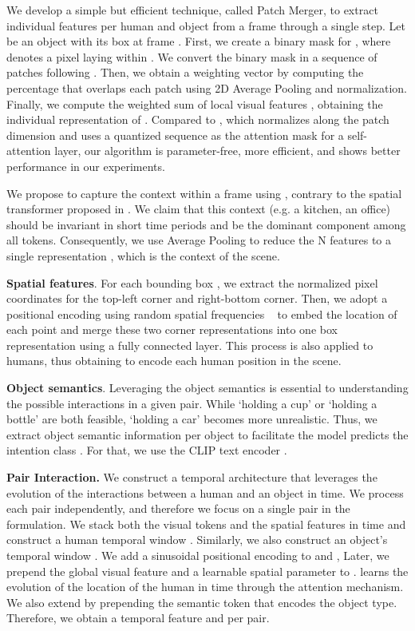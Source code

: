 \documentclass{article}
\begin{document}
We develop a simple but efficient technique, called Patch Merger, to extract individual features per human and object from a frame through a single step. Let  be an object  with its box  at frame . First, we create a binary mask for , where  denotes a pixel laying within . We convert the binary mask in a sequence of patches following \cite{dosovitskiy2020vit}. Then, we obtain a weighting vector  by computing the percentage that  overlaps each patch using 2D Average Pooling and normalization. Finally, we compute the weighted sum of local visual features , obtaining the individual representation of . Compared to \citep{park2023viplo}, which normalizes along the patch dimension and uses a quantized sequence as the attention mask for a self-attention layer, our algorithm is parameter-free, more efficient, and shows better performance in our experiments.

We propose to capture the context within a frame using , contrary to the spatial transformer proposed in \citep{NI2023103741}. We claim that this context (e.g. a kitchen, an office) should be invariant in short time periods and be the dominant component among all  tokens. Consequently,  we use Average Pooling to reduce the N  features to a single representation , which is the context of the scene. 

\textbf{Spatial features}. For each bounding box , we extract the  normalized pixel coordinates for the top-left corner and right-bottom corner. Then, we adopt a positional encoding using random spatial frequencies ~\citep{posembed_fourier} to embed the location of each point and merge these two corner representations into one box representation  using a fully connected layer.  This process is also applied to humans, thus obtaining  to encode each human  position in the scene.

\textbf{Object semantics}. Leveraging the object semantics is essential to understanding the possible interactions in a given pair. While `holding a cup' or `holding a bottle' are both feasible, `holding a car' becomes more unrealistic. Thus, we extract object semantic information   per object  to facilitate the model predicts the intention class . For that, we use the CLIP text encoder \citep{clip}.


\textbf{Pair Interaction. }
We construct a temporal architecture that leverages the evolution of the interactions between a human  and an object  in time. We process each pair independently, and therefore we focus on a single pair in the formulation. We stack both the visual tokens  and the spatial features  in time and construct a human temporal window . Similarly, we also construct an object's temporal window . We add a sinusoidal positional encoding to   and , Later, we prepend the global visual feature and a learnable spatial parameter  to .  learns the evolution of the location of the human in time through the attention mechanism. We also extend   by prepending the semantic token  that encodes the object type.  Therefore, we obtain a temporal feature  and  per pair. 
\end{document}
